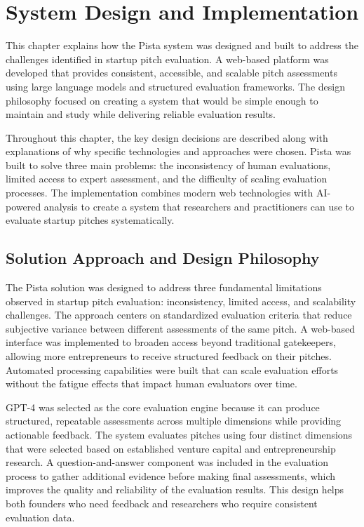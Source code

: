\chapter{System Design and Implementation} \label{ch:problem-solution}

This chapter explains how the Pista system was designed and built to address the challenges identified in startup pitch evaluation. A web-based platform was developed that provides consistent, accessible, and scalable pitch assessments using large language models and structured evaluation frameworks. The design philosophy focused on creating a system that would be simple enough to maintain and study while delivering reliable evaluation results.

Throughout this chapter, the key design decisions are described along with explanations of why specific technologies and approaches were chosen. Pista was built to solve three main problems: the inconsistency of human evaluations, limited access to expert assessment, and the difficulty of scaling evaluation processes. The implementation combines modern web technologies with AI-powered analysis to create a system that researchers and practitioners can use to evaluate startup pitches systematically.

\section{Solution Approach and Design Philosophy} \label{sec:solution-approach}

The Pista solution was designed to address three fundamental limitations observed in startup pitch evaluation: inconsistency, limited access, and scalability challenges. The approach centers on standardized evaluation criteria that reduce subjective variance between different assessments of the same pitch. A web-based interface was implemented to broaden access beyond traditional gatekeepers, allowing more entrepreneurs to receive structured feedback on their pitches. Automated processing capabilities were built that can scale evaluation efforts without the fatigue effects that impact human evaluators over time.

GPT-4 was selected as the core evaluation engine because it can produce structured, repeatable assessments across multiple dimensions while providing actionable feedback. The system evaluates pitches using four distinct dimensions that were selected based on established venture capital and entrepreneurship research. A question-and-answer component was included in the evaluation process to gather additional evidence before making final assessments, which improves the quality and reliability of the evaluation results. This design helps both founders who need feedback and researchers who require consistent evaluation data.

